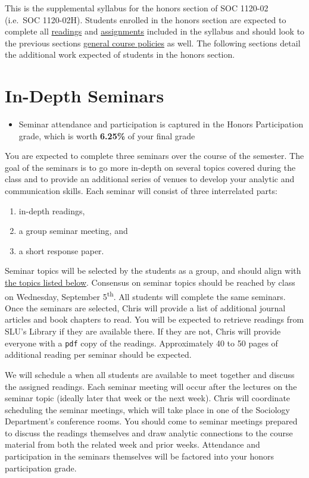 \documentclass[]{book}
\providecommand{\tightlist}{%
  \setlength{\itemsep}{0pt}\setlength{\parskip}{0pt}}
\newenvironment{rmdblock}[1]
  {\begin{shaded*}
  \begin{itemize}
  \renewcommand{\labelitemi}{
    \raisebox{-.7\height}[0pt][0pt]{
      {\setkeys{Gin}{width=3em,keepaspectratio}\texttt{[image: images/\#1]}}
    }
  }
  \item
  }
  {
  \end{itemize}
  \end{shaded*}
  }
\newenvironment{rmdtip}
  {\begin{rmdblock}{tip}}
  {\end{rmdblock}}
\begin{document}
This is the supplemental syllabus for the honors section of SOC 1120-02 (i.e.~SOC 1120-02H). Students enrolled in the honors section are expected to complete all \href{/lecture-schedule.html}{readings} and \href{/assignments-and-grading.html}{assignments} included in the syllabus and should look to the previous sections \href{/course-policies.html}{general course policies} as well. The following sections detail the additional work expected of students in the honors section.

\hypertarget{in-depth-seminars}{%
\section{In-Depth Seminars}\label{in-depth-seminars}}

\begin{rmdtip}
Seminar attendance and participation is captured in the Honors
Participation grade, which is worth \textbf{6.25\%} of your final grade
\end{rmdtip}

You are expected to complete three seminars over the course of the semester. The goal of the seminars is to go more in-depth on several topics covered during the class and to provide an additional series of venues to develop your analytic and communication skills. Each seminar will consist of three interrelated parts:

\begin{enumerate}
\def\labelenumi{\arabic{enumi}.}
\tightlist
\item
  in-depth readings,
\item
  a group seminar meeting, and
\item
  a short response paper.
\end{enumerate}

Seminar topics will be selected by the students as a group, and should align with \href{/honors-seminar-topics.html}{the topics listed below}. Consensus on seminar topics should be reached by class on Wednesday, September 5\textsuperscript{th}. All students will complete the same seminars. Once the seminars are selected, Chris will provide a list of additional journal articles and book chapters to read. You will be expected to retrieve readings from SLU's Library if they are available there. If they are not, Chris will provide everyone with a \texttt{pdf} copy of the readings. Approximately 40 to 50 pages of additional reading per seminar should be expected.

We will schedule a when all students are available to meet together and discuss the assigned readings. Each seminar meeting will occur after the lectures on the seminar topic (ideally later that week or the next week). Chris will coordinate scheduling the seminar meetings, which will take place in one of the Sociology Department's conference rooms. You should come to seminar meetings prepared to discuss the readings themselves and draw analytic connections to the course material from both the related week and prior weeks. Attendance and participation in the seminars themselves will be factored into your honors participation grade.
\end{document}
